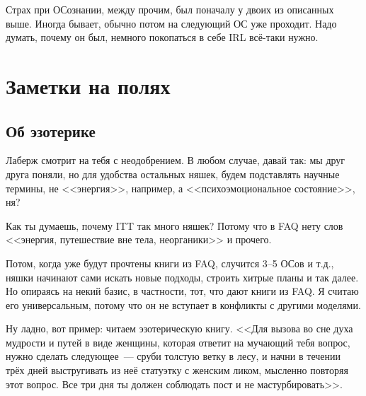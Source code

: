 \documentclass[a5paper,12pt,twoside]{memoir}
\begin{document}
Страх при ОСознании, между прочим, был поначалу у двоих из описанных выше. Иногда бывает, обычно потом на следующий ОС уже проходит. Надо думать, почему он был, немного покопаться в себе IRL всё-таки нужно. 



\chapter{Заметки на полях}



\section{Об эзотерике}


\medskip

Лаберж смотрит на тебя с неодобрением. В любом случае, давай так: мы друг друга поняли, но для удобства остальных няшек, будем подставлять научные термины, не <<энергия>>, например, а <<психоэмоциональное состояние>>, ня? 

Как ты думаешь, почему ITT так много няшек? Потому что в FAQ нету слов <<энергия, путешествие вне тела, неорганики>> и прочего. 

Потом, когда уже будут прочтены книги из FAQ, случится 3--5 ОСов и т.д., няшки начинают сами искать новые подходы, строить хитрые планы и так далее. Но опираясь на некий базис, в частности, тот, что дают книги из FAQ. Я считаю его универсальным, потому что он не вступает в конфликты с другими моделями. 

Ну ладно, вот пример: читаем эзотерическую книгу. <<Для вызова во сне духа мудрости и путей в виде женщины, которая ответит на мучающий тебя вопрос, нужно сделать следующее~--- сруби толстую ветку в лесу, и начни в течении трёх дней выстругивать из неё статуэтку с женским ликом, мысленно повторяя этот вопрос. Все три дня ты должен соблюдать пост и не мастурбировать>>. 
\end{document}
